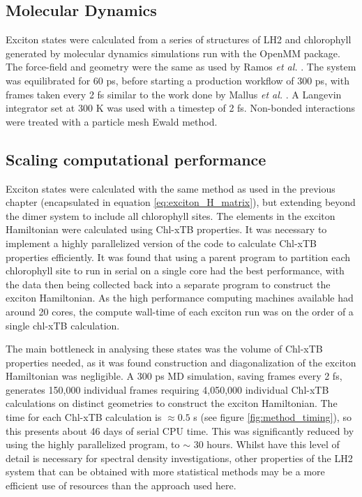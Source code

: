 \subsection{Molecular Dynamics}
\label{subsec:specdens_MD}

Exciton states were calculated from a series of structures of LH2 and chlorophyll
generated by molecular dynamics simulations run with the OpenMM package. The force-field 
and geometry were the same as used by Ramos \emph{et al.} \cite{Mennucci2019}. The
system was equilibrated for 60 ps, before starting a production workflow of 300 ps, 
with frames taken every 2 fs similar to the work done by Mallus \emph{et al.} \cite{Mallus2018}.
A Langevin integrator set at 300 K was used with a timestep of 2 fs. Non-bonded
interactions were treated with a particle mesh Ewald method.

\subsection{Scaling computational performance}
\label{subsec:specdens_scaling}

Exciton states were calculated with the same method as used in the previous chapter
(encapsulated in equation \ref{eq:exciton_H_matrix}), but extending beyond the dimer 
system to include all chlorophyll sites. The elements in the exciton Hamiltonian 
were calculated using Chl-xTB properties. It was necessary to implement a highly
parallelized version of the code to calculate Chl-xTB properties efficiently. It
was found that using a parent program to partition each chlorophyll site to run 
in serial on a single core had the best performance, with the data then being collected
back into a separate program to construct the exciton Hamiltonian. As the high performance
computing machines available had around 20 cores, the compute wall-time of each 
exciton run was on the order of a single chl-xTB calculation.

The main bottleneck in analysing these states was the volume of Chl-xTB properties
needed, as it was found construction and diagonalization of the exciton Hamiltonian
was negligible. A 300 ps MD simulation, saving frames every 2 fs, generates 150,000
individual frames requiring 4,050,000 individual Chl-xTB calculations on distinct 
geometries to construct the exciton Hamiltonian. The time for each Chl-xTB calculation
is $\approx 0.5$ s (see figure \ref{fig:method_timing}), so this presents about
46 days of serial CPU time. This was significantly reduced by using the highly parallelized
program, to $\sim$ 30 hours. Whilst have this level of detail is necessary for spectral
density investigations, other properties of the LH2 system that can be obtained 
with more statistical methods may be a more efficient use of resources than the 
approach used here.

